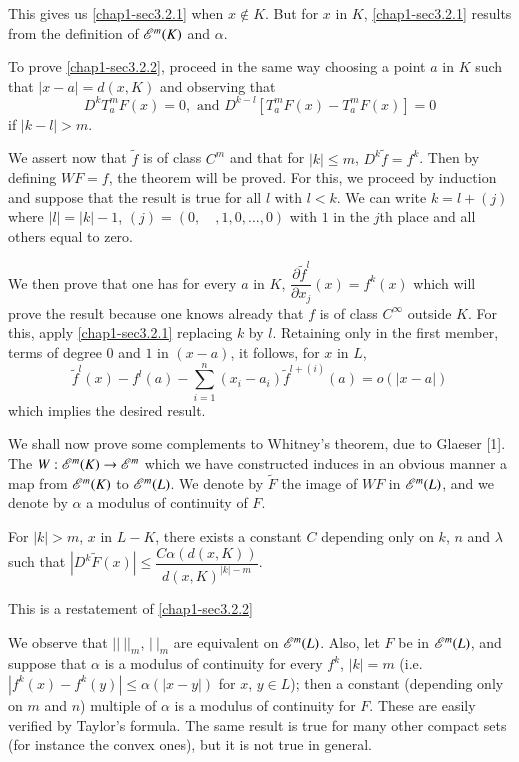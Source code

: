 This gives us \eqref{chap1-sec3.2.1} when $x\not\in K$. But for $x$ in $K$, \eqref{chap1-sec3.2.1} results from the definition of $\mathscr{E}^{m}(K)$ and $\alpha$.

To prove \eqref{chap1-sec3.2.2}, proceed in the same way choosing a point $a$ in $K$ such that $|x-a|=d(x,K)$ and observing that
$$
D^{k}T^{m}_{a}F(x)=0,\text{ and } D^{k-l}[T^{m}_{a}F(x)-T^{m}_{a}F(x)]=0
$$
if $|k-l|>m$.

We assert now that $\widetilde{f}$ is of class $C^{m}$ and that for $|k|\leq m$, $D^{k}\widetilde{f}=f^{k}$. Then by defining $WF=f$, the theorem will be proved. For this, we proceed by induction and suppose that the result is true for all $l$ with $l<k$. We can write $k=l+(j)$ where $|l|=|k|-1$, $(j)=(0,\quad ,1,0,\ldots,0)$ with $1$ in the $j$th place and all others equal to zero.

We then prove that one has for every $a$ in $K$, $\dfrac{\partial \widetilde{f}^{l}}{\partial x_{j}}(x)=f^{k}(x)$ which will prove the result because one knows already that $f$ is of class $C^{\infty}$ outside $K$. For this, apply \eqref{chap1-sec3.2.1} replacing $k$ by $l$. Retaining only in the first member, terms of degree $0$ and $1$ in $(x-a)$, it follows, for $x$ in $L$,
$$
\widetilde{f}^{l}(x)-f^{l}(a)-\sum\limits^{n}_{i=1}(x_{i}-a_{i})\widetilde{f}^{l+(i)}(a)=o(|x-a|)
$$
which implies the desired result.

We shall now prove some complements to Whitney's theorem, due to Glaeser [1]. The $W:\mathscr{E}^{m}(K)\to \mathscr{E}^{m}$ which we have constructed induces in an obvious manner a map from $\mathscr{E}^{m}(K)$ to $\mathscr{E}^{m}(L)$. We denote by $\widetilde{F}$ the image of $WF$ in $\mathscr{E}^{m}(L)$, and we denote by $\alpha$ a modulus of continuity of $F$.

\begin{Complement}\label{chap1-com3.3}
For $|k|>m$, $x$ in $L-K$, there exists a constant $C$ depending only on $k$, $n$ and $\lambda$ such that $|D^{k}\widetilde{F}(x)|\leq \dfrac{C\alpha(d(x,K))}{d(x,K)^{|k|-m}}$.
\end{Complement}

This is a restatement of \eqref{chap1-sec3.2.2}

\begin{remark}\label{chap1-rem3.4}
We observe that $||~||_{m}$, $|~|_{m}$ are equivalent on $\mathscr{E}^{m}(L)$. Also, let $F$ be in $\mathscr{E}^{m}(L)$, and suppose that $\alpha$ is a modulus of continuity for every $f^{k}$, $|k|=m$ (i.e. $|f^{k}(x)-f^{k}(y)|\leq \alpha(|x-y|)$ for $x$, $y\in L$); then a constant (depending only on $m$ and $n$) multiple of $\alpha$ is a modulus of continuity for $F$. These are easily verified by Taylor's formula. The same result is true for many other compact sets (for instance the convex ones), but it is not true in general.
\end{remark}

